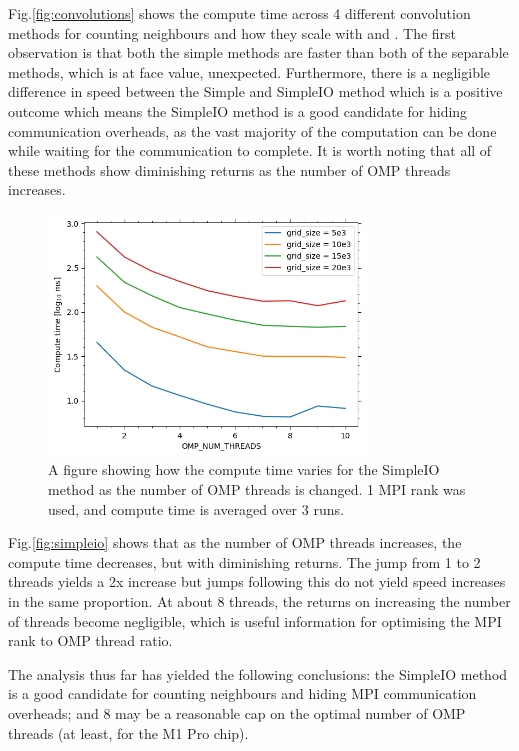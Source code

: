     Fig.\eqref{fig:convolutions} shows the compute time across 4 different convolution methods for counting neighbours
    and how they scale with  and .
    The first observation is that both the simple methods are faster than both of the separable methods, which is
    at face value, unexpected.
    Furthermore, there is a negligible difference in speed between the Simple and SimpleIO method which is a positive
    outcome which means the SimpleIO method is a good candidate for hiding communication overheads, as the vast majority
    of the computation can be done while waiting for the communication to complete.
    It is worth noting that all of these methods show diminishing returns as the number of OMP threads increases.
    \begin{figure}[htb]
    \centering
    \includegraphics[width=0.75\textwidth]{./figures/simpleio}
    \caption{A figure showing how the compute time varies for the SimpleIO method as the number of OMP threads is changed.
    1 MPI rank was used, and compute time is averaged over 3 runs.}
    \label{fig:simpleio}
    \end{figure}

    Fig.\eqref{fig:simpleio} shows that as the number of OMP threads increases, the compute time decreases, but with
    diminishing returns.
    The jump from 1 to 2 threads yields a 2x increase but jumps following this do not yield speed increases in the same
    proportion.
    At about 8 threads, the returns on increasing the number of threads become negligible, which is useful information
    for optimising the MPI rank to OMP thread ratio.

    The analysis thus far has yielded the following conclusions: the SimpleIO method is a good candidate for counting
    neighbours and hiding MPI communication overheads; and 8 may be a reasonable cap on the optimal number of OMP threads
    (at least, for the M1 Pro chip).

